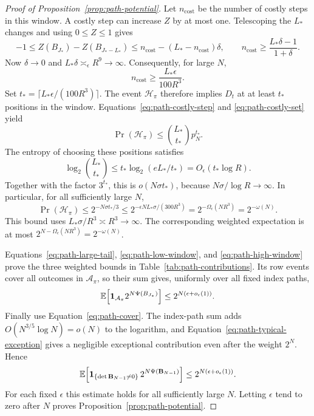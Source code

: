 \begin{proof}[Proof of Proposition~\ref{prop:path-potential}]
Let \(n_{\mathrm{cost}}\) be the number of costly steps in this window.
A costly step can increase \(Z\) by at most one. Telescoping the \(L_*\) changes and
using \(0\le Z\le1\) gives
\[
 -1\le Z(B_{J_*})-Z(B_{J_*-L_*})
       \le n_{\mathrm{cost}}-(L_*-n_{\mathrm{cost}})\delta,
 \qquad
 n_{\mathrm{cost}}\ge\frac{L_*\delta-1}{1+\delta}.
\]
Now \(\delta\to0\) and
\(L_*\delta\asymp_\epsilon R^9\to\infty\). Consequently, for large
\(N\),
\[
 n_{\mathrm{cost}}\ge \frac{L_*\epsilon}{100R^3}.
\]
Set \(t_*=\lceil L_*\epsilon/(100R^3)\rceil\). The event
\(\mathcal H_\pi\) therefore implies \(D_t\) at at least \(t_*\)
positions in the window. Equations~\eqref{eq:path-costly-step} and
\eqref{eq:path-costly-set} yield
\[
 \Pr(\mathcal H_\pi)\le\binom{L_*}{t_*}p_N^{t_*}.
\]
The entropy of choosing these positions satisfies
\[
 \log_2\binom{L_*}{t_*}
 \le t_*\log_2(eL_*/t_*)=O_\epsilon(t_*\log R).
\]
Together with the factor \(3^{t_*}\), this is
\(o(N\sigma t_*)\), because \(N\sigma/\log R\to\infty\).
In particular, for all sufficiently large \(N\),
\begin{equation}\label{eq:path-high-window}
 \Pr(\mathcal H_\pi)
 \le2^{-N\sigma t_*/3}
 \le2^{-\epsilon N L_*\sigma/(300R^3)}
 =2^{-\Omega_\epsilon(NR^3)}
 =2^{-\omega(N)}.
\end{equation}
This bound uses \(L_*\sigma/R^3\asymp R^3\to\infty\).
The corresponding weighted expectation is at most
\(2^{N-\Omega_\epsilon(NR^3)}=2^{-\omega(N)}\).

Equations~\eqref{eq:path-large-tail}, \eqref{eq:path-low-window}, and
\eqref{eq:path-high-window} prove the three weighted bounds in
Table~\ref{tab:path-contributions}. Its row events cover all outcomes in
\(\mathcal A_\pi\), so their sum gives, uniformly over all fixed index paths,
\[
 \mathbb E\!\left[\mathbf 1_{\mathcal A_\pi}2^{N\Psi(B_{J_*})}\right]
 \le2^{N(\epsilon+o_\epsilon(1))}.
\]
Finally use Equation~\eqref{eq:path-cover}. The index-path sum adds
\(O(N^{3/5}\log N)=o(N)\) to the logarithm, and
Equation~\eqref{eq:path-typical-exception} gives a negligible
exceptional contribution even after the weight \(2^N\). Hence
\[
 \mathbb E\!\left[\mathbf 1_{\{\det\mathbf B_{N-1}\ne0\}}\,
                 2^{N\Psi(\mathbf B_{N-1})}\right]
 \le2^{N(\epsilon+o_\epsilon(1))}.
\]
For each fixed \(\epsilon\) this estimate holds for all sufficiently
large \(N\). Letting \(\epsilon\) tend to zero after \(N\) proves
Proposition~\ref{prop:path-potential}.
\end{proof}

